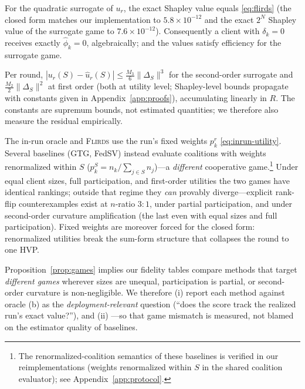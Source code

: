 \begin{proposition}\label{prop:closed-form}
For the quadratic surrogate of $u_r$, the exact Shapley value equals
\eqref{eq:flirds} (the closed form matches our implementation to
$5.8\times 10^{-12}$ and the exact $2^N$ Shapley value of the surrogate game to
$7.6\times 10^{-12}$). Consequently a client with $\delta_k = 0$ receives exactly
$\hat\phi_k = 0$, algebraically; and the values satisfy efficiency for the
surrogate game.
\end{proposition}

\begin{proposition}\label{prop:residual}
Per round, $|u_r(S) - \hat u_r(S)| \le \frac{M_3}{6}\|\Delta_S\|^3$ for the
second-order surrogate and $\frac{M_2}{2}\|\Delta_S\|^2$ at first order (both
at utility level; Shapley-level bounds propagate with constants given in
Appendix~\ref{app:proofs}), accumulating linearly in $R$. The constants are supremum bounds, not
estimated quantities; we therefore also measure the residual empirically.
\end{proposition}

\begin{proposition}\label{prop:games}
The in-run oracle and \textsc{Flirds} use the run's fixed weights $p_k^r$
\eqref{eq:inrun-utility}. Several baselines (GTG, FedSV) instead evaluate
coalitions with weights renormalized within $S$
($p_k^S = n_k / \sum_{j\in S} n_j$)---a \emph{different} cooperative game.\footnote{The
renormalized-coalition semantics of these baselines is verified in our
reimplementations (weights renormalized within $S$ in the shared coalition
evaluator); see Appendix~\ref{app:protocol}.} Under
equal client sizes, full participation, and first-order utilities the two games
have identical rankings; outside that regime they \emph{can} provably
diverge---explicit rank-flip counterexamples exist at $n$-ratio $3{:}1$, under
partial participation, and under second-order curvature amplification (the
last even with equal sizes and full participation). Fixed weights are moreover forced
for the closed form: renormalized utilities break the sum-form structure that
collapses the round to one HVP.
\end{proposition}

\begin{remark}
Proposition~\ref{prop:games} implies our fidelity tables compare methods that
target \emph{different games} wherever sizes are unequal, participation is
partial, or second-order curvature is non-negligible. We therefore (i) report each method against oracle (b) as the
\emph{deployment-relevant} question (``does the score track the realized run's
exact value?''), and (ii) ---so that
game mismatch is measured, not blamed on the estimator quality of baselines.
\end{remark}

